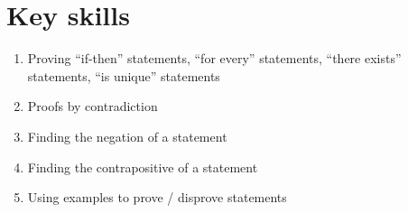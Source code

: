 \documentclass[12pt]{amsart}
\newcommand{\e}{\varepsilon}
\renewcommand{\d}{\delta}
\begin{document}
\section*{Key skills}

\begin{enumerate}
	\item Proving ``if-then'' statements, ``for every'' statements, ``there exists'' statements, ``is unique'' statements
	\item Proofs by contradiction
	\item Finding the negation of a statement
	\item Finding the contrapositive of a statement
	\item Using examples to prove / disprove statements
			\begin{comment}
	\item Proving that a number is the supremum of a set

	\item Proving that a sequence converges to some value using the definition

		\item Algebra with limits of sequences: using these to determine if a sequence converges, and to what

	\item Using squeeze theorem to show sequences converge


	\item Relationship between boundedness, convergence, and monotonicity
					\item Proofs by induction
	

	\item Relationship between convergence/boundedness of sequences and convergence of subsequences


	\item Using the $\e-\d$ definition to compute limits
					
	\item Using algebra/squeeze theorem to compute limits
	
	\item Using the $\e-\d$ definition to show continuity

	\item Using algebra/compositions to show continuity
	\item Applying the $\e-\d$ definitions of limits and continuity
					\item Applying the Intermediate Value Theorem
		\item Applying Boundedness and Extreme Value Theorems
		


\end{comment}
\end{enumerate}
\end{document}
